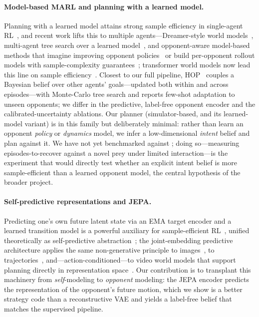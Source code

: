 \documentclass[11pt]{article}
\begin{document}
\paragraph{Model-based MARL and planning with a learned model.}
Planning with a learned model attains strong sample efficiency in single-agent
RL~\cite{schrittwieser2020,ye2021,hafner2020}, and recent work lifts this to
multiple agents---Dreamer-style world models~\cite{egorov2022}, multi-agent tree
search over a learned model~\cite{liu2024}, and opponent-aware model-based methods
that imagine improving opponent policies~\cite{yu2021} or build per-opponent
rollout models with sample-complexity guarantees~\cite{zhang2021}; transformer
world models now lead this line on sample efficiency~\cite{zhang2024marie,
deihim2025matwm}. Closest to our full pipeline, HOP~\cite{huang2024hop} couples a
Bayesian belief over other agents' goals---updated both within and across
episodes---with Monte-Carlo tree search and reports few-shot adaptation to unseen
opponents; we differ in the predictive, label-free opponent encoder and the
calibrated-uncertainty ablations. Our planner (simulator-based, and its
learned-model variant) is in this family but deliberately minimal: rather than
learn an opponent \emph{policy} or \emph{dynamics} model, we infer a
low-dimensional \emph{intent} belief and plan against it. We have not yet
benchmarked against
\cite{liu2024,egorov2022,yu2021,huang2024hop,deihim2025matwm}; doing
so---measuring episodes-to-recover against
a novel prey under limited interaction---is the experiment that would directly test
whether an explicit intent belief is more sample-efficient than a learned opponent
model, the central hypothesis of the broader project.

\paragraph{Self-predictive representations and JEPA.}
Predicting one's own future latent state via an EMA target encoder and a learned
transition model is a powerful auxiliary for sample-efficient
RL~\cite{schwarzer2021}, unified theoretically as self-predictive
abstraction~\cite{ni2024}; the joint-embedding predictive architecture applies the
same non-generative principle to images~\cite{assran2023}, to
trajectories~\cite{li2024tjepa}, and---action-conditioned---to video world models
that support planning directly in representation space~\cite{assran2025vjepa2}.
Our contribution is to transplant this machinery
from \emph{self}-modeling to \emph{opponent} modeling: the JEPA encoder predicts
the representation of the opponent's future motion, which we show is a better
strategy code than a reconstructive VAE and yields a label-free belief that matches
the supervised pipeline.
\end{document}
